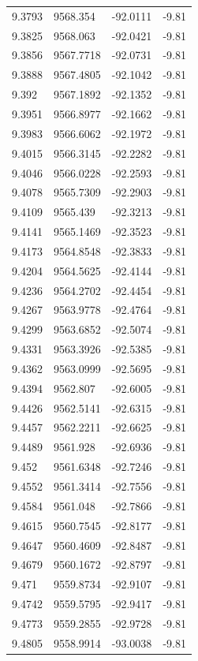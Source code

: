 \begin{table}[H]
\begin{tabular}{llll}
9.3793 & 9568.354 & -92.0111 & -9.81 \\
9.3825 & 9568.063 & -92.0421 & -9.81 \\
9.3856 & 9567.7718 & -92.0731 & -9.81 \\
9.3888 & 9567.4805 & -92.1042 & -9.81 \\
9.392 & 9567.1892 & -92.1352 & -9.81 \\
9.3951 & 9566.8977 & -92.1662 & -9.81 \\
9.3983 & 9566.6062 & -92.1972 & -9.81 \\
9.4015 & 9566.3145 & -92.2282 & -9.81 \\
9.4046 & 9566.0228 & -92.2593 & -9.81 \\
9.4078 & 9565.7309 & -92.2903 & -9.81 \\
9.4109 & 9565.439 & -92.3213 & -9.81 \\
9.4141 & 9565.1469 & -92.3523 & -9.81 \\
9.4173 & 9564.8548 & -92.3833 & -9.81 \\
9.4204 & 9564.5625 & -92.4144 & -9.81 \\
9.4236 & 9564.2702 & -92.4454 & -9.81 \\
9.4267 & 9563.9778 & -92.4764 & -9.81 \\
9.4299 & 9563.6852 & -92.5074 & -9.81 \\
9.4331 & 9563.3926 & -92.5385 & -9.81 \\
9.4362 & 9563.0999 & -92.5695 & -9.81 \\
9.4394 & 9562.807 & -92.6005 & -9.81 \\
9.4426 & 9562.5141 & -92.6315 & -9.81 \\
9.4457 & 9562.2211 & -92.6625 & -9.81 \\
9.4489 & 9561.928 & -92.6936 & -9.81 \\
9.452 & 9561.6348 & -92.7246 & -9.81 \\
9.4552 & 9561.3414 & -92.7556 & -9.81 \\
9.4584 & 9561.048 & -92.7866 & -9.81 \\
9.4615 & 9560.7545 & -92.8177 & -9.81 \\
9.4647 & 9560.4609 & -92.8487 & -9.81 \\
9.4679 & 9560.1672 & -92.8797 & -9.81 \\
9.471 & 9559.8734 & -92.9107 & -9.81 \\
9.4742 & 9559.5795 & -92.9417 & -9.81 \\
9.4773 & 9559.2855 & -92.9728 & -9.81 \\
9.4805 & 9558.9914 & -93.0038 & -9.81 \\

\end{tabular}
\end{table}

